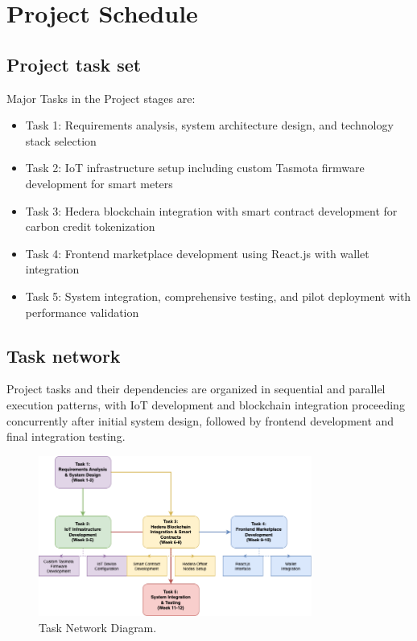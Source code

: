 \documentclass[oneside,a4paper,12pt]{book}
\begin{document}
\section{Project Schedule} 
\newpage

\subsection{Project task set}
Major Tasks in the Project stages are:
\begin{itemize}
  \item Task 1: Requirements analysis, system architecture design, and technology stack selection
  \item Task 2: IoT infrastructure setup including custom Tasmota firmware development for smart meters
  \item Task 3: Hedera blockchain integration with smart contract development for carbon credit tokenization
  \item Task 4: Frontend marketplace development using React.js with wallet integration
  \item Task 5: System integration, comprehensive testing, and pilot deployment with performance validation
\end{itemize}

\subsection{Task network}  
Project tasks and their dependencies are organized in sequential and parallel execution patterns, with IoT development and blockchain integration proceeding concurrently after initial system design, followed by frontend development and final integration testing.

\begin{figure}[h]
    \vspace{1cm}
    \centering 
    \includegraphics[width=0.8\textwidth]{tasknetwork.png} 
    \caption{Task Network Diagram.}
    \label{fig:example}
\end{figure}
\end{document}
